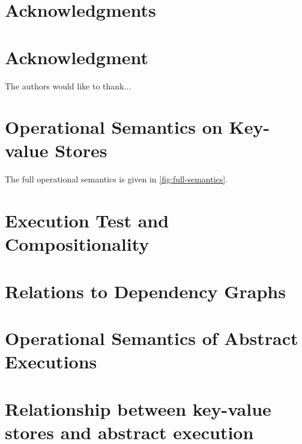 \documentclass[conference,compsoc]{IEEEtran}
\newcommand{\RootPath}{.}
\begin{document}
  \section*{Acknowledgments}
\else
  \section*{Acknowledgment}
\fi
The authors would like to thank...

  


\newpage
\onecolumn
\appendices

\section{Operational Semantics on Key-value Stores}

\label{sec:full-semantics}
The full operational semantics is given in \cref{fig:full-semantics}.

\section{Execution Test and Compositionality}
\label{app:compositionality}




\section{Relations to Dependency Graphs}
\label{app:depgraphs}
\label{sec:dependent-graph}

\section{Operational Semantics of Abstract Executions}


\section{Relationship between key-value stores and abstract execution}




\end{document}
